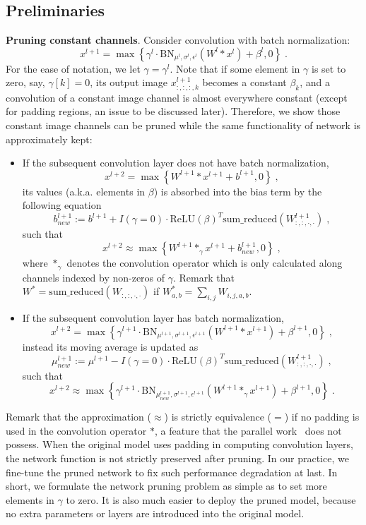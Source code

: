\documentclass{article} %
\begin{document}
\subsection{Preliminaries}
\textbf{Pruning constant channels}. Consider convolution with batch normalization:
\[x^{l+1} = \max\left\{\gamma^{l} \cdot \mbox{BN}_{\mu^l,\sigma^l,\epsilon^l}(W^{l} * x^{l}) + \beta^l, 0\right\}\;. \]
For the ease of notation, we let $\gamma =\gamma^l$.
Note that if some element in $\gamma$ is set to zero, say, $\gamma[k]=0$,
its output image $x^{l+1}_{:,:,:,k}$ becomes a constant $\beta_k$,
and a convolution of a constant image channel is almost everywhere constant
(except for padding regions, an issue to be discussed later).
Therefore, we show those constant image channels can be pruned
while  the same functionality of network is approximately kept:
\begin{itemize}
\item If the subsequent convolution layer does not have batch normalization,
  \[x^{l+2} = \max \left\{W^{l+1} * x^{l+1} + b^{l+1} , 0\right\}\;,\]
  its values (a.k.a. elements in $\beta$) is absorbed into the bias term by the following equation
  \[b_{new}^{l+1} := b^{l+1} + I(\gamma = 0) \cdot \mbox{ReLU}(\beta)^T \mbox{sum\_reduced} (W_{:,:,\cdot,\cdot}^{l+1})\;,\]
  such that
  \[x^{l+2} \approx \max \left\{ W^{l+1} *_{\gamma} x^{l+1} + b_{new}^{l+1}, 0 \right\}\;,\]
  where $*_{\gamma}$ denotes the
  convolution operator which is only calculated along channels indexed by non-zeros of $\gamma$. 
  Remark that $W^\ast = \mbox{sum\_reduced} (W_{:,:,\cdot,\cdot})$ if $W^{\ast}_{a,b} = \sum_{i,j} W_{i,j,a,b}$.
\item If the subsequent convolution layer has batch normalization,
  \[x^{l+2} = \max \left\{ \gamma^{l+1} \cdot \mbox{BN}_{\mu^{l+1},\sigma^{l+1},\epsilon^{l+1}}\left(W^{l+1} * x^{l+1}\right) + \beta^{l+1} ,0 \right\}\;,\]
  instead its moving average is updated as
  \[\mu_{new}^{l+1} := \mu^{l+1} - I(\gamma = 0) \cdot \mbox{ReLU}(\beta)^T \mbox{sum\_reduced} (W_{:,:,\cdot,\cdot}^{l+1})\;,\]
  such that
  \[x^{l+2} \approx \max \left\{ \gamma^{l+1} \cdot \mbox{BN}_{\mu_{new}^{l+1},\sigma^{l+1},\epsilon^{l+1}}
  \left(W^{l+1} *_{\gamma} x^{l+1}\right) + \beta^{l+1}, 0\right\}\;.\]
\end{itemize}
Remark that the approximation ($\approx$) is strictly equivalence ($=$) if no padding is used in the convolution operator $*$,
a feature that the parallel work~\citet{liu2017learning} does not possess. 
When the original model uses padding in computing convolution layers, the network function is not strictly preserved after pruning.
In our practice, we fine-tune the pruned network to fix such performance degradation at last. 
In short, we formulate the network pruning problem as simple as to set more elements in $\gamma$ to zero.
It is also much easier to deploy the pruned model, because no extra parameters or layers are introduced into
the original model. 
\end{document}
